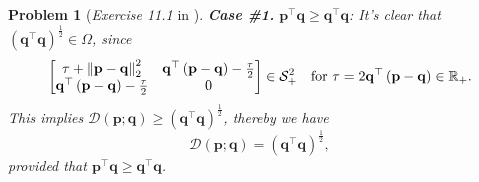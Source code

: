 \documentclass[11pt]{article}
\newtheorem{problem}{Problem}
\numberwithin{equation}{problem}
\begin{document}
\begin{problem} [\emph{Exercise 11.1} in \cite{calafiore2014optimization}]
{\indent \textbf{Case \#1.} $\mathbf{p}^{\top} \mathbf{q} \geq \mathbf{q}^{\top} \mathbf{q}$: It's clear that $\left( \mathbf{q}^{\top} \mathbf{q} \right)^{\frac{1}{2}} \in \Omega$, since
\begin{equation*}
    \begin{bmatrix}
        \tau + \left\| \mathbf{p} - \mathbf{q} \right\|_{2}^2 & \mathbf{q}^{\top} \left( \mathbf{p} - \mathbf{q} \right) - \frac{\tau}{2} \\
        \mathbf{q}^{\top} \left( \mathbf{p} - \mathbf{q} \right) - \frac{\tau}{2} & 0
    \end{bmatrix}
    \in \mathcal{S}_{+}^2 \quad \textnormal{for }
    \tau = 2 \mathbf{q}^{\top} \left( \mathbf{p} - \mathbf{q} \right) \in \mathbb{R}_{+}.
\end{equation*}
This implies $\mathcal{D} \left( \mathbf{p}; \mathbf{q} \right) \geq \left( \mathbf{q}^{\top} \mathbf{q} \right)^{\frac{1}{2}}$, thereby we have
\begin{equation}
    \label{eqn1.5}
    \mathcal{D} \left( \mathbf{p}; \mathbf{q} \right) = \left( \mathbf{q}^{\top} \mathbf{q} \right)^{\frac{1}{2}},
\end{equation}
provided that $\mathbf{p}^{\top} \mathbf{q} \geq \mathbf{q}^{\top} \mathbf{q}$.
\medskip

}
\end{problem}
\end{document}
